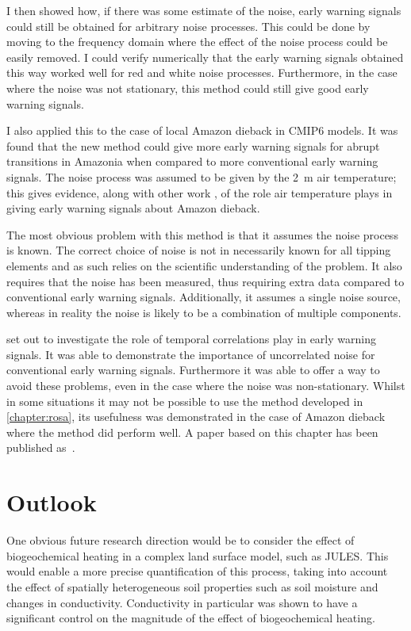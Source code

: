 I then showed how, if there was some estimate of the noise, early warning signals could still be obtained for arbitrary noise processes. This could be done by moving to the frequency domain
where the effect of the noise process could be easily removed. I could verify numerically that the early warning signals obtained this way worked well for red and white noise processes.
Furthermore, in the case where the noise was not stationary, this method could still give good early warning signals.

I also applied this to the case of local Amazon dieback in CMIP6 models. It was found that the new method could give more early warning signals for abrupt transitions in Amazonia
when compared to more conventional early warning signals. The noise process was assumed to be given by the \SI{2}{\meter} air temperature; this gives evidence, along with
other work \parencite{Parry2022,Ritchie2022}, of the role air temperature plays in giving early warning signals about Amazon dieback.

The most obvious problem with this method is that it assumes the noise process is known. The correct choice of noise is not in necessarily known for all
tipping elements and as such relies on the scientific understanding of the problem. It also requires that the noise has been measured, thus requiring extra data compared to
conventional early warning signals. Additionally, it assumes a single noise source, whereas in reality the noise is likely to be a combination of multiple components.

 set out to investigate the role of temporal correlations play in early warning signals. It was able to demonstrate the importance of uncorrelated noise
for conventional early warning signals. Furthermore it was able to offer a way to avoid these problems, even in the case where the noise was non-stationary.
Whilst in some situations it may not be possible to use the method developed in \cref{chapter:rosa}, its usefulness was demonstrated in the case of Amazon dieback
where the method did perform well. A paper based on this chapter has been published as~\cite{Clarke2023}.


\section{Outlook}
One obvious future research direction would be to consider the effect of biogeochemical heating in a complex land surface model, such as JULES\@.
This would enable a more precise quantification of this process, taking into account the effect of spatially heterogeneous soil properties such as
soil moisture and changes in conductivity. Conductivity in particular was shown to have a significant control on the magnitude of the effect of biogeochemical heating.

